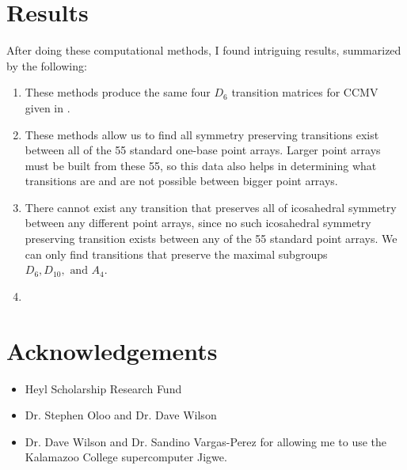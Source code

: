 \documentclass[a4paper,10pt]{article}
\theoremstyle{plain}
\theoremstyle{definition}
\theoremstyle{remark}
\begin{document}
\section{Results}
After doing these computational methods, I found intriguing results, summarized by the following:
\begin{enumerate}
	\item These methods produce the same four \( D_6 \) transition matrices for CCMV given in \cite{indelicatoetal2012}.
	
	\item These methods allow us to find all symmetry preserving transitions exist between all of the 55 standard one-base point arrays. Larger point arrays must be built from these 55, so this data also helps in determining what transitions are and are not possible between bigger point arrays.
	
	\item There cannot exist any transition that preserves all of icosahedral symmetry between any different point arrays, since no such icosahedral symmetry preserving transition exists between any of the 55 standard point arrays.
		We can only find transitions that preserve the maximal subgroups \(D_6, D_{10}, \text{ and } A_4\).
	
	\item {}
\end{enumerate}

\section{Acknowledgements}
\begin{itemize}
	\item Heyl Scholarship Research Fund
	\item Dr. Stephen Oloo and Dr. Dave Wilson
	\item Dr. Dave Wilson and Dr. Sandino Vargas-Perez for allowing me to use the Kalamazoo College supercomputer Jigwe.
\end{itemize}


\medskip

\end{document}
